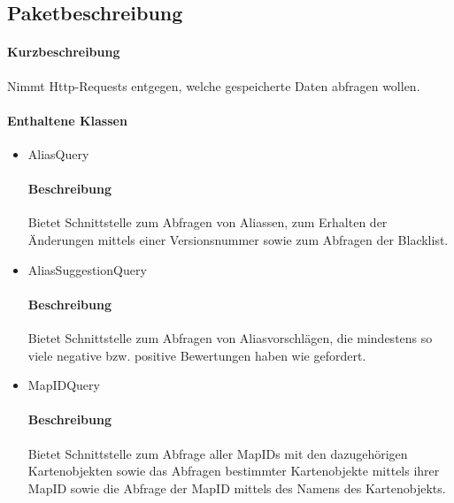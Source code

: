 \subsection*{Paketbeschreibung}%
\paragraph*{Kurzbeschreibung}
Nimmt Http-Requests entgegen, welche gespeicherte Daten abfragen wollen.
\paragraph*{Enthaltene Klassen}
\begin{itemize}
    \item AliasQuery
    		\paragraph*{Beschreibung}
            Bietet Schnittstelle zum Abfragen von Aliassen, zum Erhalten der Änderungen mittels einer Versionsnummer sowie zum Abfragen der Blacklist.
    \item AliasSuggestionQuery
    		\paragraph*{Beschreibung}
    		Bietet Schnittstelle zum Abfragen von Aliasvorschlägen, die mindestens so viele negative bzw. positive Bewertungen haben wie gefordert.
    \item MapIDQuery
    		\paragraph*{Beschreibung}
    		Bietet Schnittstelle zum Abfrage aller MapIDs mit den dazugehörigen Kartenobjekten sowie das Abfragen bestimmter Kartenobjekte mittels ihrer MapID sowie die Abfrage
            der MapID mittels des Namens des Kartenobjekts.

\end{itemize}